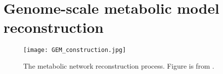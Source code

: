 


\appendix
\chapter{Genome-scale metabolic model reconstruction}
\begin{figure}[h]
    \centering
    \texttt{[image: GEM\_construction.jpg]}
    \caption{The metabolic network reconstruction process. Figure is from \cite{Thiele2010}.}
    \label{GEM reconstruction}
\end{figure}








